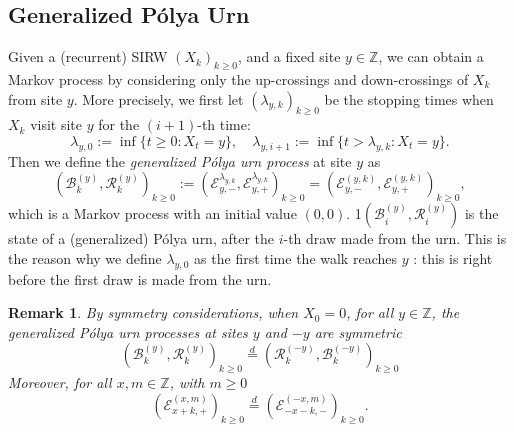 \documentclass[twoside,12pt,a4paper]{article}
\newtheorem{remark}{Remark}[section]
\numberwithin{equation}{section}
\newcommand{\edt}[1]{\textcolor{red}{#1}} %
\newcommand{\comment}[1]{\textcolor{blue}{#1}}
\begin{document}
	\subsection{Generalized P\'{o}lya  Urn}
	Given a (recurrent) SIRW $(X_k)_{k\geq 0}$, and a fixed site $y\in \mathbb{Z}$, we can obtain a Markov process by considering only the up-crossings and down-crossings of $X_k$ from site $y$. More precisely, we first let $(\lambda_{y,k})_{k\geq 0}$ be the stopping times when $X_k$ visit site $y$ for the $\left( i+1 \right) $-th time:
	\[
		\lambda_{y,0} :=\inf\{ t\geq 0: X_t = y \} , \quad \lambda_{y,i+1} := \inf\{ t> \lambda_{y, k}: X_t = y \}.
	   \] 
	   Then we define the \textit{generalized P\'olya urn process} at site $y$ as 
	  \begin{equation} \label{eq: RW to GPU}
	   \left(\mathcal{B}^{(y)}_{k},\mathcal{R}^{(y)}_{k} \right)_{k\ge 0}
	   :=\left(\mathcal{E}^{\lambda_{y,k}}_{y,-}, \mathcal{E}^{\lambda_{y,k}}_{y,+}\right)_{k\geq 0} 
	   =  \left(\mathcal{E}^{(y,k)}_{y,-}, \mathcal{E}^{(y,k)}_{y,+}\right)_{k\geq 0},
	   \end{equation}
	   which is a Markov process with an initial value $(0,0)$. 
	   1$\left(\mathcal{B}_{i}^{(y)},\mathcal{R}_{i}^{(y)} \right)$ is the state of a (generalized) P\'olya urn, after the $i$-th draw made from the urn. This is the reason why we define $\lambda_{y, 0}$ as the first time the walk reaches $y$ : this is right before the first draw is made from the urn. 
	\begin{remark}
		\label{rem:symmetry}
		By symmetry considerations, when $X_0 = 0$, for all $y \in \mathbb{Z}$, the generalized P\'{o}lya urn processes at sites $y$ and $-y$ are symmetric
		$$\left(\mathcal{B}^{(y)}_{k},\mathcal{R}^{(y)}_{k} \right)_{k\ge 0}
		\overset{d}{=} 
		\left(\mathcal{R}^{(-y)}_{k},\mathcal{B}^{(-y)}_{k} \right)_{k\ge 0} $$
		Moreover, for all $x, m \in \mathbb{Z}$, with $m\geq 0$
\[
		 \left(\mathcal{E}^{(x,m)}_{x+k,+} \right)_{k\geq 0} \overset{d}{=} \left(\mathcal{E}^{(-x,m)}_{-x-k,-} \right)_{k\geq 0}.
		\]
	   \end{remark}

	   
	 
\end{document}
